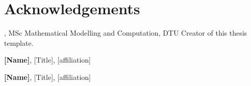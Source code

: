 \section*{Acknowledgements}
\textbf{\thesisauthor}, MSc Mathematical Modelling and Computation, DTU \newline
Creator of this thesis template.

\textbf{[Name]}, [Title], [affiliation] \newline
[text]

\textbf{[Name]}, [Title], [affiliation] \newline
[text]

